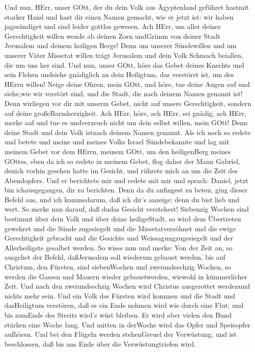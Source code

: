  Und nun, HErr, unser GOtt, der du dein Volk aus
Ägyptenland geführet hastmit starker Hand und hast dir einen Namen
gemacht, wie er jetzt ist: wir haben jagesündiget und sind leider
gottlos gewesen.  Ach HErr, um aller deiner Gerechtigkeit
willen wende ab deinen Zorn undGrimm von deiner Stadt Jerusalem und
deinem heiligen Berge! Denn um unserer Sündewillen und um unserer Väter
Missetat willen trägt Jerusalem und dein Volk Schmach beiallen, die um
uns her sind.  Und nun, unser GOtt, höre das Gebet deines
Knechts und sein Flehen undsiehe gnädiglich an dein Heiligtum, das
verstöret ist, um des HErrn willen!  Neige deine Ohren,
mein GOtt, und höre, tue deine Augen auf und siehe,wie wir verstört
sind, und die Stadt, die nach deinem Namen genannt ist! Denn wirliegen
vor dir mit unserm Gebet, nicht auf unsere Gerechtigkeit, sondern auf
deine großeBarmherzigkeit.  Ach HErr, höre, ach HErr, sei
gnädig, ach HErr, merke auf und tue es undverzeuch nicht um dein selbst
willen, mein GOtt! Denn deine Stadt und dein Volk istnach deinem Namen
genannt.  Als ich noch so redete und betete und meine und
meines Volks Israel Sündebekannte und lag mit meinem Gebet vor dem
HErrn, meinem GOtt, um den heiligenBerg meines GOttes, 
eben da ich so redete in meinem Gebet, flog daher der Mann Gabriel,
denich vorhin gesehen hatte im Gesicht, und rührete mich an um die Zeit
des Abendopfers.  Und er berichtete mir und redete mit mir
und sprach: Daniel, jetzt bin ichausgegangen, dir zu berichten.
 Denn da du anfingest zu beten, ging dieser Befehl aus, und
ich kommedarum, daß ich dir's anzeige; denn du bist lieb und wert. So
merke nun darauf, daß dudas Gesicht verstehest!  Siebenzig
Wochen sind bestimmt über dein Volk und über deine heiligeStadt, so wird
dem Übertreten gewehret und die Sünde zugesiegelt und die
Missetatversöhnet und die ewige Gerechtigkeit gebracht und die Gesichte
und Weissagungzugesiegelt und der Allerheiligste gesalbet werden.
 So wisse nun und merke: Von der Zeit an, so ausgehet der
Befehl, daßJerusalem soll wiederum gebauet werden, bis auf Christum, den
Fürsten, sind siebenWochen und zweiundsechzig Wochen, so werden die
Gassen und Mauern wieder gebauetwerden, wiewohl in kümmerlicher Zeit.
 Und nach den zweiundsechzig Wochen wird Christus
ausgerottet werdenund nichts mehr sein. Und ein Volk des Fürsten wird
kommen und die Stadt und dasHeiligtum verstören, daß es ein Ende nehmen
wird wie durch eine Flut; und bis zumEnde des Streits wird's wüst
bleiben.  Er wird aber vielen den Bund stärken eine Woche
lang. Und mitten in derWoche wird das Opfer und Speisopfer aufhören. Und
bei den Flügeln werden stehenGreuel der Verwüstung; und ist beschlossen,
daß bis ans Ende über die Verwüstungtriefen wird.

